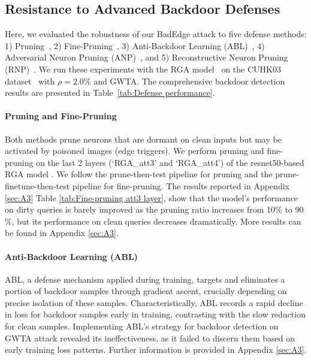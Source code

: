 \documentclass[sigconf,authordraft]{acmart}
\begin{document}
\subsection{Resistance to Advanced Backdoor Defenses}\label{sec:resistance}
Here, we evaluated the robustness of our BadEdge attack to five defense methods: 1) Pruning~\cite{dhillon2018stochastic}, 2) Fine-Pruning~\cite{liu2018fine}, 3) Anti-Backdoor Learning (ABL)~\cite{li2021anti}, 4) Adversarial Neuron Pruning (ANP)~\cite{wu2021adversarial}, and 5) Reconstructive Neuron Pruning (RNP)~\cite{li2023reconstructive}. We run these experiments with the RGA model~\cite{zhang2020relation} on the CUHK03 dataset~\cite{li2014deepreid} with $\rho=2.0\%$ and GWTA. The comprehensive backdoor detection results are presented in Table~\ref{tab:Defense performance}.

\paragraph{Pruning and Fine-Pruning}
Both methods \cite{dhillon2018stochastic,liu2018fine} prune neurons that are dormant on clean inputs but may be activated by poisoned images (edge triggers). We perform pruning and fine-pruning on the last 2 layers (`RGA\_att3' and `RGA\_att4') of the resnet50-based RGA model \cite{zhang2020relation}. We follow the prune-then-test pipeline for pruning and the prune-finetune-then-test pipeline for fine-pruning. The results reported in Appendix \ref{sec:A3} Table \ref{tab:Fine-pruning att3 layer}, show that the model's performance on dirty queries is barely improved as the pruning ratio increases from 10$\%$ to 90$\%$, but its performance on clean queries decreases dramatically. More results can be found in Appendix \ref{sec:A3}.

\paragraph{Anti-Backdoor Learning (ABL)}
ABL, a defense mechanism applied during training, targets and eliminates a portion of backdoor samples through gradient ascent, crucially depending on precise isolation of these samples. Characteristically, ABL records a rapid decline in loss for backdoor samples early in training, contrasting with the slow reduction for clean samples. Implementing ABL's strategy for backdoor detection on GWTA attack revealed its ineffectiveness, as it failed to discern them based on early training loss patterns. Further information is provided in Appendix \ref{sec:A3}.
\end{document}
